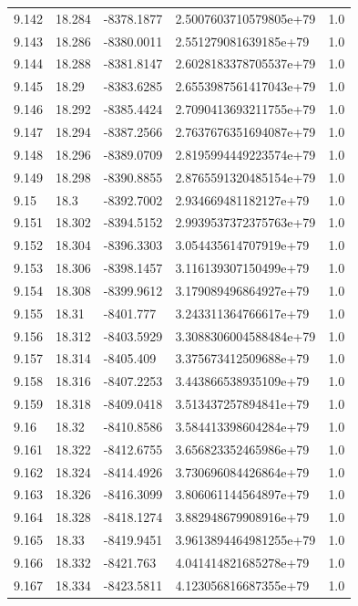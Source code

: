 \begin{tabular}{lllll}
9.142 & 18.284 & -8378.1877 & 2.5007603710579805e+79 & 1.0 \\
9.143 & 18.286 & -8380.0011 & 2.551279081639185e+79 & 1.0 \\
9.144 & 18.288 & -8381.8147 & 2.6028183378705537e+79 & 1.0 \\
9.145 & 18.29 & -8383.6285 & 2.6553987561417043e+79 & 1.0 \\
9.146 & 18.292 & -8385.4424 & 2.7090413693211755e+79 & 1.0 \\
9.147 & 18.294 & -8387.2566 & 2.7637676351694087e+79 & 1.0 \\
9.148 & 18.296 & -8389.0709 & 2.8195994449223574e+79 & 1.0 \\
9.149 & 18.298 & -8390.8855 & 2.8765591320485154e+79 & 1.0 \\
9.15 & 18.3 & -8392.7002 & 2.934669481182127e+79 & 1.0 \\
9.151 & 18.302 & -8394.5152 & 2.9939537372375763e+79 & 1.0 \\
9.152 & 18.304 & -8396.3303 & 3.054435614707919e+79 & 1.0 \\
9.153 & 18.306 & -8398.1457 & 3.116139307150499e+79 & 1.0 \\
9.154 & 18.308 & -8399.9612 & 3.179089496864927e+79 & 1.0 \\
9.155 & 18.31 & -8401.777 & 3.243311364766617e+79 & 1.0 \\
9.156 & 18.312 & -8403.5929 & 3.3088306004588484e+79 & 1.0 \\
9.157 & 18.314 & -8405.409 & 3.375673412509688e+79 & 1.0 \\
9.158 & 18.316 & -8407.2253 & 3.443866538935109e+79 & 1.0 \\
9.159 & 18.318 & -8409.0418 & 3.513437257894841e+79 & 1.0 \\
9.16 & 18.32 & -8410.8586 & 3.584413398604284e+79 & 1.0 \\
9.161 & 18.322 & -8412.6755 & 3.656823352465986e+79 & 1.0 \\
9.162 & 18.324 & -8414.4926 & 3.730696084426864e+79 & 1.0 \\
9.163 & 18.326 & -8416.3099 & 3.806061144564897e+79 & 1.0 \\
9.164 & 18.328 & -8418.1274 & 3.882948679908916e+79 & 1.0 \\
9.165 & 18.33 & -8419.9451 & 3.9613894464981255e+79 & 1.0 \\
9.166 & 18.332 & -8421.763 & 4.041414821685278e+79 & 1.0 \\
9.167 & 18.334 & -8423.5811 & 4.123056816687355e+79 & 1.0 \\

\end{tabular}
